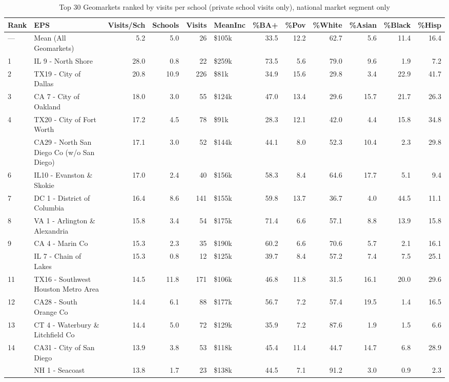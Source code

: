 \begin{table}
\centering
\caption{Top 30 Geomarkets ranked by visits per school (private school visits only), national market segment only}
\centering
\begin{tabular}[t]{llrrrlrrrrrr}
\toprule
Rank & EPS & Visits/Sch & Schools & Visits & MeanInc & \%BA+ & \%Pov & \%White & \%Asian & \%Black & \%Hisp\\
\midrule
— & Mean (All Geomarkets) & 5.2 & 5.0 & 26 & \$105k & 33.5 & 12.2 & 62.7 & 5.6 & 11.4 & 16.4\\
1 & IL 9 - North Shore & 28.0 & 0.8 & 22 & \$259k & 73.5 & 5.6 & 79.0 & 9.6 & 1.9 & 7.2\\
2 & TX19 - City of Dallas & 20.8 & 10.9 & 226 & \$81k & 34.9 & 15.6 & 29.8 & 3.4 & 22.9 & 41.7\\
3 & CA 7 - City of Oakland & 18.0 & 3.0 & 55 & \$124k & 47.0 & 13.4 & 29.6 & 15.7 & 21.7 & 26.3\\
4 & TX20 - City of Fort Worth & 17.2 & 4.5 & 78 & \$91k & 28.3 & 12.1 & 42.0 & 4.4 & 15.8 & 34.8\\
\addlinespace
5 & CA29 - North San Diego Co (w/o San Diego) & 17.1 & 3.0 & 52 & \$144k & 44.1 & 8.0 & 52.3 & 10.4 & 2.3 & 29.8\\
6 & IL10 - Evanston \& Skokie & 17.0 & 2.4 & 40 & \$156k & 58.3 & 8.4 & 64.6 & 17.7 & 5.1 & 9.4\\
7 & DC 1 - District of Columbia & 16.4 & 8.6 & 141 & \$155k & 59.8 & 13.7 & 36.7 & 4.0 & 44.5 & 11.1\\
8 & VA 1 - Arlington \& Alexandria & 15.8 & 3.4 & 54 & \$175k & 71.4 & 6.6 & 57.1 & 8.8 & 13.9 & 15.8\\
9 & CA 4 - Marin Co & 15.3 & 2.3 & 35 & \$190k & 60.2 & 6.6 & 70.6 & 5.7 & 2.1 & 16.1\\
\addlinespace
10 & IL 7 - Chain of Lakes & 15.3 & 0.8 & 12 & \$125k & 39.7 & 8.4 & 57.2 & 7.4 & 7.5 & 25.1\\
11 & TX16 - Southwest Houston Metro Area & 14.5 & 11.8 & 171 & \$106k & 46.8 & 11.8 & 31.5 & 16.1 & 20.0 & 29.6\\
12 & CA28 - South Orange Co & 14.4 & 6.1 & 88 & \$177k & 56.7 & 7.2 & 57.4 & 19.5 & 1.4 & 16.5\\
13 & CT 4 - Waterbury \& Litchfield Co & 14.4 & 5.0 & 72 & \$129k & 35.9 & 7.2 & 87.6 & 1.9 & 1.5 & 6.6\\
14 & CA31 - City of San Diego & 13.9 & 3.8 & 53 & \$118k & 45.4 & 11.4 & 44.7 & 14.7 & 6.8 & 28.9\\
\addlinespace
15 & NH 1 - Seacoast & 13.8 & 1.7 & 23 & \$138k & 44.5 & 7.1 & 91.2 & 3.0 & 0.9 & 2.3\\

\end{tabular}
\end{table}
